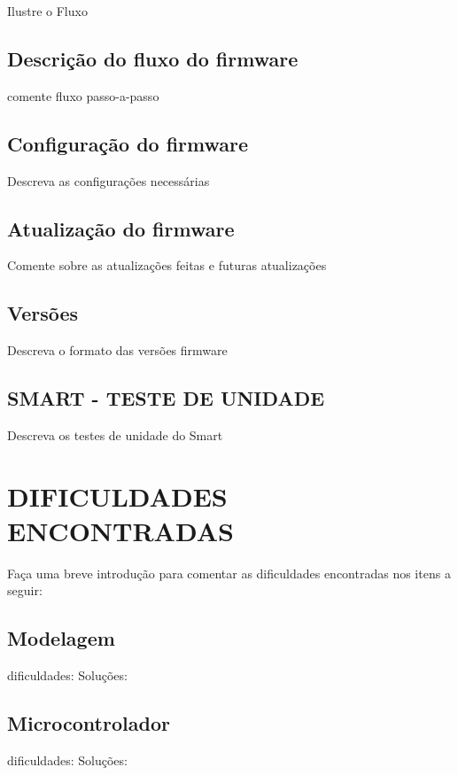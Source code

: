 Ilustre o Fluxo 

\subsection{Descrição do fluxo do firmware}

comente fluxo passo-a-passo 

\subsection{Configuração do firmware}

Descreva as configurações necessárias

\subsection{Atualização do firmware}

Comente sobre as atualizações feitas e futuras atualizações

\subsection{Versões}

Descreva o formato das versões firmware

\subsection{SMART - TESTE DE UNIDADE}

Descreva os testes de unidade do Smart

\section{DIFICULDADES ENCONTRADAS}

Faça uma breve introdução para comentar as dificuldades encontradas nos itens a seguir:

\subsection{Modelagem}

dificuldades:
Soluções:

\subsection{Microcontrolador}

dificuldades:
Soluções:


